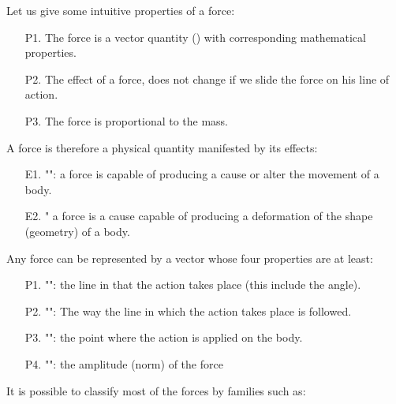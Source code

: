 	Let us give some intuitive properties of a force:
	\begin{enumerate}
		\item[P1.] The force is a vector quantity () with corresponding mathematical properties.
		\item[P2.] The effect of a force, does not change if we slide the force on his line of action.
		\item[P3.] The force is proportional to the mass.
	\end{enumerate}
	A force is therefore a physical quantity manifested by its effects:
	\begin{enumerate}
		\item[E1.] "": a force is capable of producing a cause or alter the movement of a body.
		
		\item[E2.] " a force is a cause capable of producing a deformation of the shape (geometry) of a body.
	\end{enumerate}
	Any force can be represented by a vector whose four properties are at least:
	\begin{enumerate}
		\item[P1.] "": the line in that the action takes place (this include the angle).
		
		\item[P2.] "": The way the line in which the action takes place is followed.
		
		\item[P3.] "": the point where the action is applied on the body.
		
		\item[P4.] "": the amplitude (norm) of the force
	\end{enumerate}
	It is possible to classify most of the forces by families such as:
